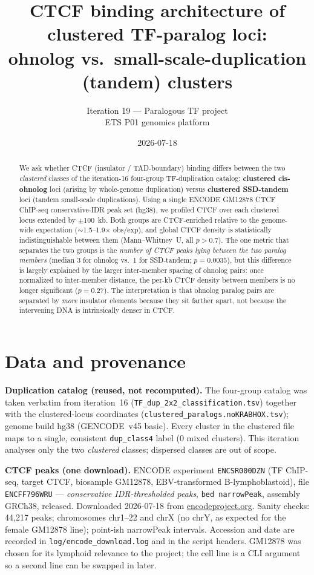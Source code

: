 \documentclass[11pt]{article}
\title{\textbf{CTCF binding architecture of clustered TF-paralog loci:\\
ohnolog vs.\ small-scale-duplication (tandem) clusters}}
\author{Iteration 19 --- Paralogous TF project\\\small ETS P01 genomics platform}
\date{2026-07-18}
\newcommand{\ohno}{\textcolor{ohno}{\textbf{clustered cis-ohnolog}}}
\newcommand{\ssd}{\textcolor{ssd}{\textbf{clustered SSD-tandem}}}
\begin{document}
\maketitle

\begin{abstract}
\noindent We ask whether CTCF (insulator / TAD-boundary) binding differs between the two
\emph{clustered} classes of the iteration-16 four-group TF-duplication catalog:
\ohno{} loci (arising by whole-genome duplication) versus \ssd{} loci (tandem small-scale
duplications). Using a single ENCODE GM12878 CTCF ChIP-seq conservative-IDR peak set
(hg38), we profiled CTCF over each clustered locus extended by $\pm$100~kb. Both groups
are CTCF-enriched relative to the genome-wide expectation ($\sim$1.5--1.9$\times$ obs/exp),
and global CTCF density is statistically indistinguishable between them (Mann--Whitney~U,
all $p>0.7$). The one metric that separates the two groups is the \emph{number of CTCF peaks
lying between the two paralog members} (median 3 for ohnolog vs.\ 1 for SSD-tandem;
$p=0.0035$), but this difference is largely explained by the larger inter-member spacing of
ohnolog pairs: once normalized to inter-member distance, the per-kb CTCF density between
members is no longer significant ($p=0.27$). The interpretation is that ohnolog paralog
pairs are separated by \emph{more} insulator elements because they sit farther apart, not
because the intervening DNA is intrinsically denser in CTCF.
\end{abstract}

\section{Data and provenance}
\textbf{Duplication catalog (reused, not recomputed).} The four-group catalog was taken
verbatim from iteration~16 (\texttt{TF\_dup\_2x2\_classification.tsv}) together with the
clustered-locus coordinates (\texttt{clustered\_paralogs.noKRABHOX.tsv}); genome build
hg38 (GENCODE~v45 basic). Every cluster in the clustered file maps to a single, consistent
\texttt{dup\_class4} label (0 mixed clusters). This iteration analyses only the two
\emph{clustered} classes; dispersed classes are out of scope.

\textbf{CTCF peaks (one download).} ENCODE experiment \texttt{ENCSR000DZN}
(TF ChIP-seq, target CTCF, biosample GM12878, EBV-transformed B-lymphoblastoid),
file \texttt{ENCFF796WRU} --- \emph{conservative IDR-thresholded peaks}, \texttt{bed
narrowPeak}, assembly GRCh38, released. Downloaded 2026-07-18 from
\href{https://www.encodeproject.org}{encodeproject.org}. Sanity checks: 44{,}217 peaks;
chromosomes chr1--22 and chrX (no chrY, as expected for the female GM12878 line);
point-ish narrowPeak intervals. Accession and date are recorded in
\texttt{log/encode\_download.log} and in the script headers. GM12878 was chosen for its
lymphoid relevance to the project; the cell line is a CLI argument so a second line can be
swapped in later.
\end{document}
